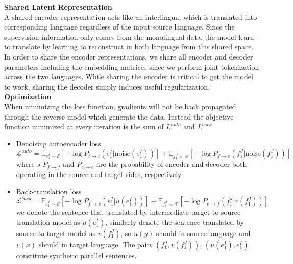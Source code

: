 \textbf{Shared Latent Representation} \\
A shared encoder representation acts like an interlingua, which is translated into corresponding language regardless of the input source language. Since the  supervision information only comes from the monolingual data, the model learn to translate by learning to reconstruct in both language from this shared space.\\
In order to share the encoder representations, we share all encoder and decoder parameters including the embedding matrices since we perform joint tokenization across the two languages. While sharing the encoder is critical to get the model to work, sharing the decoder simply induces useful regularization.\\



\textbf{Optimization}\\
When minimizing the loss function, gradients will not be back propagated through the reverse model which generate the data. Instead the objective function minimized at every iteration is the sum of $L^{auto}$ and $L^{back}$
\begin{itemize}
	\item Denoising autoencoder loss
	\[ \mathcal{L}^{auto} = \mathbb{E}_{e_1^I \sim \mathcal{E}}[-\log P_{t\rightarrow t}(e_1^I|\text{noise}(e_1^I))] + \mathbb{E}_{f_1^J\sim \mathcal{F}} [-\log P_{f\rightarrow e}(f_1^J|\text{noise}(f_1^J))]\]
	where $s$ $P_{f\rightarrow f}$ and $P_{e\rightarrow e}$ are the probability of encoder and decoder both operating in the source and target sides, respectively
	\item Back-translation loss
	\[ \mathcal{L}^{back} = \mathbb{E}_{e_1^I\sim \mathcal{E}} [-\log P_{f\rightarrow e}(e_1^I|u(e_1^I))] +  \mathbb{E}_{f_1^J\sim \mathcal{F}} [-\log P_{e\rightarrow f}(f_1^J|v(f_1^J))]\]
	 we denote the sentence that translated by intermediate target-to-source translation model as $u(e_1^I)$, similarly denote the sentence translated by source-to-target model as $v(f_1^J)$, so $u(y)$ should in source language and $v(x)$ should in target language. The pairs $(f_1^J, v(f_1^J))$, $(u(e_1^I), e_1^I)$ constitute synthetic parallel  sentences.
\end{itemize}










